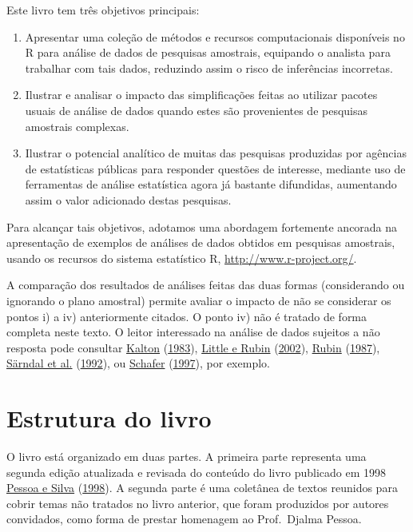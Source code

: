 \documentclass[
  12pt,
  brazilian,
]{book}
\theoremstyle{definition}
\theoremstyle{definition}
\theoremstyle{definition}
\theoremstyle{definition}
\theoremstyle{remark}
\begin{document}
Este livro tem três objetivos principais:

\begin{enumerate}
\def\labelenumi{\arabic{enumi})}
\item
  Apresentar uma coleção de métodos e recursos computacionais disponíveis no R para análise de dados de pesquisas amostrais, equipando o analista para trabalhar com tais dados, reduzindo assim o risco de inferências incorretas.
\item
  Ilustrar e analisar o impacto das simplificações feitas ao utilizar pacotes usuais de análise de dados quando estes são provenientes de pesquisas amostrais complexas.
\item
  Ilustrar o potencial analítico de muitas das pesquisas produzidas por agências de estatísticas públicas para responder questões de interesse, mediante uso de ferramentas de análise estatística agora já bastante difundidas, aumentando assim o valor adicionado destas pesquisas.
\end{enumerate}

Para alcançar tais objetivos, adotamos uma abordagem fortemente ancorada na
apresentação de exemplos de análises de dados obtidos em pesquisas amostrais, usando os recursos do sistema estatístico R, \url{http://www.r-project.org/}.

A comparação dos resultados de análises feitas das duas formas (considerando ou
ignorando o plano amostral) permite avaliar o impacto de não se considerar os pontos i) a iv) anteriormente citados. O ponto iv) não é tratado de forma completa neste texto. O leitor interessado na análise de dados sujeitos a não resposta pode consultar \protect\hyperlink{ref-kalton83a}{Kalton} (\protect\hyperlink{ref-kalton83a}{1983}), \protect\hyperlink{ref-LR2002}{Little e Rubin} (\protect\hyperlink{ref-LR2002}{2002}), \protect\hyperlink{ref-Rubin87}{Rubin} (\protect\hyperlink{ref-Rubin87}{1987}), \protect\hyperlink{ref-SSW92}{Särndal et al.} (\protect\hyperlink{ref-SSW92}{1992}), ou \protect\hyperlink{ref-Schafer1997}{Schafer} (\protect\hyperlink{ref-Schafer1997}{1997}), por exemplo.

\hypertarget{estrutura-do-livro}{%
\section{Estrutura do livro}\label{estrutura-do-livro}}

O livro está organizado em duas partes. A primeira parte representa uma segunda edição atualizada e revisada do conteúdo do livro publicado em 1998 \protect\hyperlink{ref-Pessoa1998}{Pessoa e Silva} (\protect\hyperlink{ref-Pessoa1998}{1998}). A segunda parte é uma coletânea de textos reunidos para cobrir temas não tratados no livro anterior, que foram produzidos por autores convidados, como forma de prestar homenagem ao Prof.~Djalma Pessoa.
\end{document}

